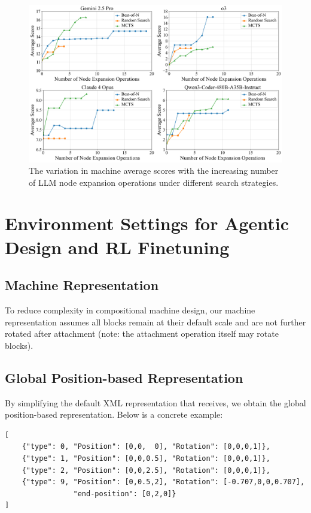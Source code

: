 \begin{figure}[h!]
  \centering
  \includegraphics[width=\linewidth]{figures/RL_Metrics/search_strategy.png}
  \caption{\footnotesize The variation in machine average scores with the increasing number of LLM node expansion operations under different search strategies.}
  \label{fig:search_curve}
\end{figure}

\clearpage
\newpage
\section{Environment Settings for Agentic Design and RL Finetuning}

\subsection{Machine Representation}
\label{sec:machine_rep}

To reduce complexity in compositional machine design, our machine representation assumes all blocks remain at their default scale and are not further rotated after attachment (note: the attachment operation itself may rotate blocks).

\subsection{Global Position-based Representation}
By simplifying the default XML representation that \envname receives, we obtain the global position-based representation. Below is a concrete example:
\begin{lstlisting}
[
    {"type": 0, "Position": [0,0,  0], "Rotation": [0,0,0,1]},
    {"type": 1, "Position": [0,0,0.5], "Rotation": [0,0,0,1]},
    {"type": 2, "Position": [0,0,2.5], "Rotation": [0,0,0,1]},
    {"type": 9, "Position": [0,0.5,2], "Rotation": [-0.707,0,0,0.707],
                "end-position": [0,2,0]}
]
\end{lstlisting}

